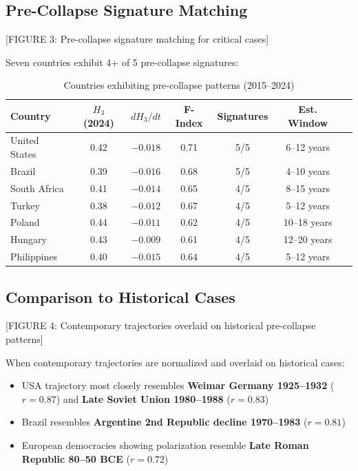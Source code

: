 \documentclass[11pt,a4paper]{article}
\begin{document}
\subsection{Pre-Collapse Signature Matching}

[FIGURE 3: Pre-collapse signature matching for critical cases]

Seven countries exhibit 4+ of 5 pre-collapse signatures:

\begin{table}[H]
\centering
\caption{Countries exhibiting pre-collapse patterns (2015--2024)}
\begin{tabular}{lcccccc}
\toprule
\textbf{Country} & \textbf{$H_3$ (2024)} & \textbf{$dH_3/dt$} & \textbf{F-Index} & \textbf{Signatures} & \textbf{Est. Window} \\
\midrule
United States & 0.42 & $-0.018$ & 0.71 & 5/5 & 6--12 years \\
Brazil & 0.39 & $-0.016$ & 0.68 & 5/5 & 4--10 years \\
South Africa & 0.41 & $-0.014$ & 0.65 & 4/5 & 8--15 years \\
Turkey & 0.38 & $-0.012$ & 0.67 & 4/5 & 5--12 years \\
Poland & 0.44 & $-0.011$ & 0.62 & 4/5 & 10--18 years \\
Hungary & 0.43 & $-0.009$ & 0.61 & 4/5 & 12--20 years \\
Philippines & 0.40 & $-0.015$ & 0.64 & 4/5 & 5--12 years \\
\bottomrule
\end{tabular}
\end{table}

\subsection{Comparison to Historical Cases}

[FIGURE 4: Contemporary trajectories overlaid on historical pre-collapse patterns]

When contemporary trajectories are normalized and overlaid on historical cases:
\begin{itemize}
\item USA trajectory most closely resembles \textbf{Weimar Germany 1925--1932} ($r = 0.87$) and \textbf{Late Soviet Union 1980--1988} ($r = 0.83$)
\item Brazil resembles \textbf{Argentine 2nd Republic decline 1970--1983} ($r = 0.81$)
\item European democracies showing polarization resemble \textbf{Late Roman Republic 80--50 BCE} ($r = 0.72$)
\end{itemize}
\end{document}
